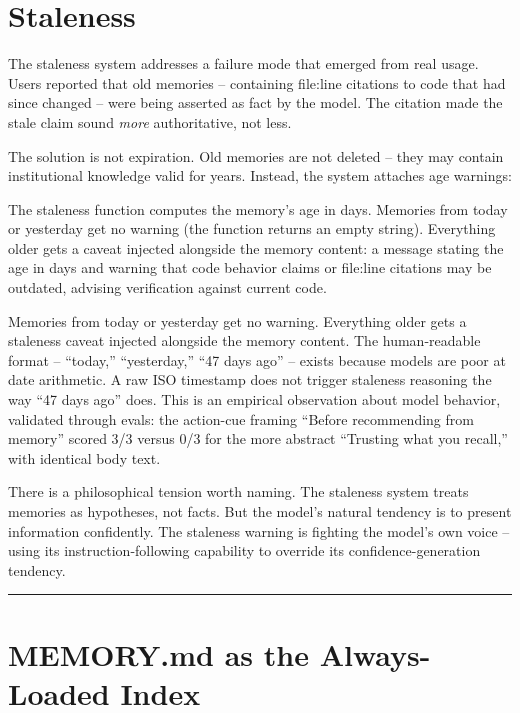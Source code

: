 \documentclass[
  english,
  11pt,
  letterpaper,
]{book}
\begin{document}
\section{Staleness}\label{staleness}

The staleness system addresses a failure mode that emerged from real
usage. Users reported that old memories -- containing file:line
citations to code that had since changed -- were being asserted as fact
by the model. The citation made the stale claim sound \emph{more}
authoritative, not less.

The solution is not expiration. Old memories are not deleted -- they may
contain institutional knowledge valid for years. Instead, the system
attaches age warnings:

The staleness function computes the memory's age in days. Memories from
today or yesterday get no warning (the function returns an empty
string). Everything older gets a caveat injected alongside the memory
content: a message stating the age in days and warning that code
behavior claims or file:line citations may be outdated, advising
verification against current code.

Memories from today or yesterday get no warning. Everything older gets a
staleness caveat injected alongside the memory content. The
human-readable format -- ``today,'' ``yesterday,'' ``47 days ago'' --
exists because models are poor at date arithmetic. A raw ISO timestamp
does not trigger staleness reasoning the way ``47 days ago'' does. This
is an empirical observation about model behavior, validated through
evals: the action-cue framing ``Before recommending from memory'' scored
3/3 versus 0/3 for the more abstract ``Trusting what you recall,'' with
identical body text.

There is a philosophical tension worth naming. The staleness system
treats memories as hypotheses, not facts. But the model's natural
tendency is to present information confidently. The staleness warning is
fighting the model's own voice -- using its instruction-following
capability to override its confidence-generation tendency.

\begin{center}\rule{0.5\linewidth}{0.5pt}\end{center}

\section{MEMORY.md as the Always-Loaded
Index}\label{memory.md-as-the-always-loaded-index}
\end{document}
